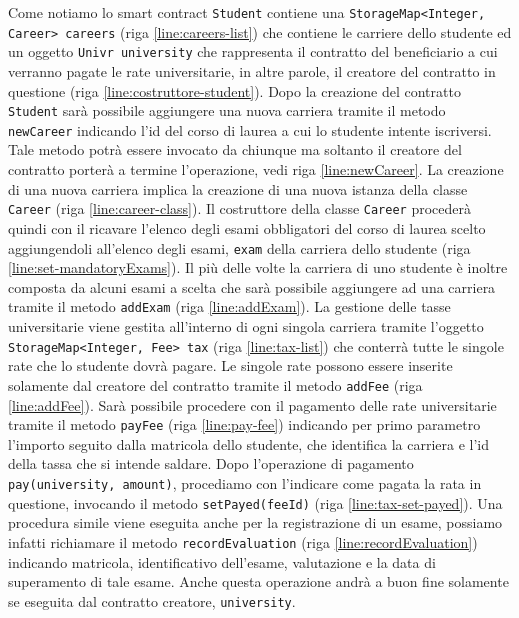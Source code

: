 %
Come notiamo lo smart contract \lstinline|Student| contiene una \lstinline|StorageMap<Integer, Career> careers| (riga \ref{line:careers-list}) che contiene le carriere dello studente ed un oggetto \lstinline|Univr university| che rappresenta il contratto del beneficiario a cui verranno pagate le rate universitarie, in altre parole, il creatore del contratto in questione (riga \ref{line:costruttore-student}). Dopo la creazione del contratto \lstinline|Student| sarà possibile aggiungere una nuova carriera tramite il metodo \lstinline|newCareer| indicando l'id del corso di laurea a cui lo studente intente iscriversi. Tale metodo potrà essere invocato da chiunque ma soltanto il creatore del contratto porterà a termine l'operazione, vedi riga \ref{line:newCareer}. La creazione di una nuova carriera implica la creazione di una nuova istanza della classe \lstinline|Career| (riga \ref{line:career-class}). Il costruttore della classe \lstinline|Career| procederà quindi con il ricavare l'elenco degli esami obbligatori del corso di laurea scelto aggiungendoli all'elenco degli esami, \lstinline|exam| della carriera dello studente (riga \ref{line:set-mandatoryExams}). Il più delle volte la carriera di uno studente è inoltre composta da alcuni esami a scelta che sarà possibile aggiungere ad una carriera tramite il metodo \lstinline|addExam| (riga \ref{line:addExam}). La gestione delle tasse universitarie viene gestita all'interno di ogni singola carriera tramite l'oggetto \lstinline|StorageMap<Integer, Fee> tax| (riga \ref{line:tax-list}) che conterrà tutte le singole rate che lo studente dovrà pagare. Le singole rate possono essere inserite solamente dal creatore del contratto tramite il metodo \lstinline|addFee| (riga \ref{line:addFee}). Sarà possibile procedere con il pagamento delle rate universitarie tramite il metodo \lstinline|payFee| (riga \ref{line:pay-fee}) indicando per primo parametro l'importo seguito dalla matricola dello studente, che identifica la carriera e l'id della tassa che si intende saldare. Dopo l'operazione di pagamento \lstinline|pay(university, amount)|, procediamo con l'indicare come pagata la rata in questione, invocando il metodo \lstinline|setPayed(feeId)| (riga \ref{line:tax-set-payed}). Una procedura simile viene eseguita anche per la registrazione di un esame, possiamo infatti richiamare il metodo \lstinline|recordEvaluation| (riga \ref{line:recordEvaluation}) indicando matricola, identificativo dell'esame, valutazione e la data di superamento di tale esame. Anche questa operazione andrà a buon fine solamente se eseguita dal contratto creatore, \lstinline|university|. 

